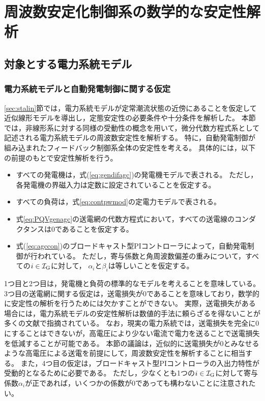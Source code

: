 \documentclass[tombow,dvipdfmx]{corona-a5-1.1}
\begin{document}
\section{周波数安定化制御系の数学的な安定性解析\advanced}\label{sec:mathnpas}

\subsection{対象とする電力系統モデル\advanced}\label{sec:objmod}

\smallskip
\subsubsection{電力系統モデルと自動発電制御に関する仮定}

\ref{sec:stalin}節では，電力系統モデルが定常潮流状態の近傍にあることを仮定して近似線形モデルを導出し，定態安定性の必要条件や十分条件を解析した。
本節では，非線形系に対する同様の受動性の概念を用いて，微分代数方程式系として記述される電力系統モデルの周波数安定性を解析する。
特に，自動発電制御が組み込まれたフィードバック制御系全体の安定性を考える。
具体的には，以下の前提のもとで安定性解析を行う。
\begin{itemize}
\item すべての発電機は，式(\ref{eq:gendifagc})の発電機モデルで表される。
ただし，各発電機の界磁入力は定数に設定されていることを仮定する。
\item すべての負荷は，式\ref{eq:contpwmod}の定電力モデルで表される。
\item 式\ref{eq:PQVgenagc}の送電網の代数方程式において，すべての送電線のコンダクタンスは0であることを仮定する。
\item 式(\ref{eq:agccon})のブロードキャスト型PIコントローラによって，自動発電制御が行われている。
ただし，寄与係数と角周波数偏差の重みについて，すべての$i\in \mathcal{I}_{\rm G}$に対して，
$\alpha_i$と$\beta_i$は等しいことを仮定する。
\end{itemize}

1つ目と2つ目は，発電機と負荷の標準的なモデルを考えることを意味している。
3つ目の送電網に関する仮定は，送電損失が0であることを意味しており，数学的に安定性の解析を行うためには欠かすことができない。
実際，送電損失がある場合には，電力系統モデルの安定性解析は数値的手法に頼らざるを得ないことが多くの文献で指摘されている\cite{narasimhamurthi1984existence,chang1995direct,chiang2011direct,yang2019distributed}。
なお，現実の電力系統では，送電損失を完全に0にすることはできないが，高電圧により少ない電流で電力を送ることで送電損失を低減することが可能である。
本節の議論は，近似的に送電損失が0とみなせるような高電圧による送電を前提にして，周波数安定性を解析することに相当する。
また，4つ目の仮定は，ブロードキャスト型PIコントローラの入出力特性が受動的となるために必要である。
ただし，少なくとも1つの$i\in \mathcal{I}_{\rm G}$に対して寄与係数$\alpha_i$が正であれば，いくつかの係数が0であっても構わないことに注意されたい。
\end{document}
